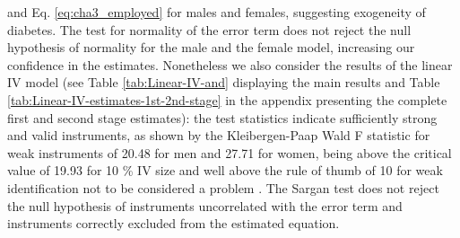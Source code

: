 and Eq. \ref{eq:cha3_employed} for males and females, suggesting exogeneity
of diabetes. The test for normality of the error term does not reject
the null hypothesis of normality for the male and the female model,
increasing our confidence in the estimates. Nonetheless we also consider
the results of the linear \ac{IV} model (see Table \ref{tab:Linear-IV-and} displaying the main results and
Table \ref{tab:Linear-IV-estimates-1st-2nd-stage} in the appendix
presenting the complete first and second stage estimates): the test statistics indicate
sufficiently strong and valid instruments, as shown by the Kleibergen-Paap
Wald F statistic for weak instruments of 20.48 for men and 27.71 for
women, being above the critical value of 19.93 for 10 \% \ac{IV}
size and well above the rule of thumb of 10 for weak identification
not to be considered a problem \parencite{Staiger1997,Baum2007}. The
Sargan test does not reject the null hypothesis of instruments uncorrelated
with the error term and instruments correctly excluded from the estimated
equation. 
\afterpage{\clearpage}
